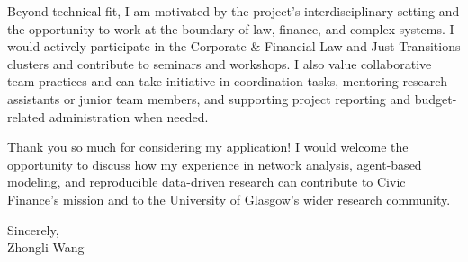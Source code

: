 \documentclass[11pt]{article}
\begin{document}
Beyond technical fit, I am motivated by the project’s interdisciplinary setting and the opportunity to work at the boundary of law, finance, and complex systems. I would actively participate in the Corporate \& Financial Law and Just Transitions clusters and contribute to seminars and workshops. I also value collaborative team practices and can take initiative in coordination tasks, mentoring research assistants or junior team members, and supporting project reporting and budget-related administration when needed.


Thank you so much for considering my application! I would welcome the opportunity to discuss how my experience in network analysis, agent-based modeling, and reproducible data-driven research can contribute to Civic Finance’s mission and to the University of Glasgow’s wider research community.

\vspace{0.5cm}

\noindent Sincerely,\\[0.9cm]
\noindent Zhongli Wang
\end{document}
